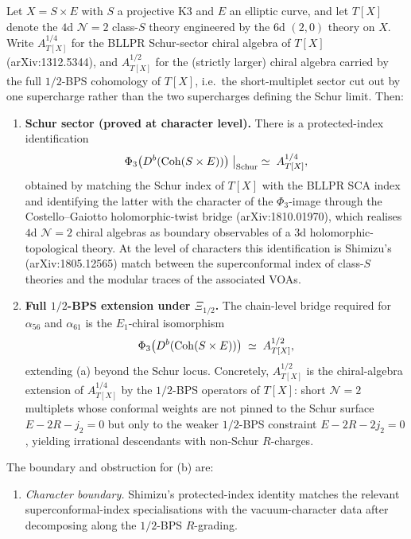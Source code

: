 \begin{theorem}
\label{conj:cy-c-i3-half-bps}
Let $X = S \times E$ with $S$ a projective K3 and $E$ an elliptic curve, and let $T[X]$ denote the $4$d $\mathcal{N} = 2$ class-$S$ theory engineered by the $6$d $(2,0)$ theory on $X$. Write $A^{1/4}_{T[X]}$ for the BLLPR Schur-sector chiral algebra of $T[X]$ (arXiv:1312.5344), and $A^{1/2}_{T[X]}$ for the (strictly larger) chiral algebra carried by the full $1/2$-BPS cohomology of $T[X]$, i.e.\ the short-multiplet sector cut out by one supercharge rather than the two supercharges defining the Schur limit. Then:
\begin{enumerate}[label=\textup{(\alph*)}]
 \item \textbf{Schur sector (proved at character level).} There is a protected-index identification
 \[
 \Phi_3\bigl(D^b(\mathrm{Coh}(S \times E))\bigr)\bigm|_{\mathrm{Schur}} \;\simeq\; A^{1/4}_{T[X]},
 \]
 obtained by matching the Schur index of $T[X]$ with the BLLPR SCA index and identifying the latter with the character of the $\Phi_3$-image through the Costello--Gaiotto holomorphic-twist bridge (arXiv:1810.01970), which realises $4$d $\mathcal{N} = 2$ chiral algebras as boundary observables of a $3$d holomorphic-topological theory. At the level of characters this identification is Shimizu's (arXiv:1805.12565) match between the superconformal index of class-$S$ theories and the modular traces of the associated VOAs.
 \item \textbf{Full $1/2$-BPS extension under \(\Xi_{1/2}\).} The chain-level bridge required for \(\alpha_{56}\) and \(\alpha_{61}\) is the \(E_1\)-chiral isomorphism
 \[
 \Phi_3\bigl(D^b(\mathrm{Coh}(S \times E))\bigr) \;\simeq\; A^{1/2}_{T[X]},
\]
 extending (a) beyond the Schur locus. Concretely, $A^{1/2}_{T[X]}$ is the chiral-algebra extension of $A^{1/4}_{T[X]}$ by the $1/2$-BPS operators of $T[X]$: short $\mathcal{N} = 2$ multiplets whose conformal weights are not pinned to the Schur surface $E - 2R - j_2 = 0$ but only to the weaker $1/2$-BPS constraint $E - 2R - 2j_2 = 0$, yielding irrational descendants with non-Schur $R$-charges.
\end{enumerate}
The boundary and obstruction for (b) are:
\begin{enumerate}[label=\textup{(E\arabic*)}]
 \item \emph{Character boundary.} Shimizu's protected-index identity matches the relevant superconformal-index specialisations with the vacuum-character data after decomposing along the $1/2$-BPS $R$-grading.

\end{enumerate}
\end{theorem}
